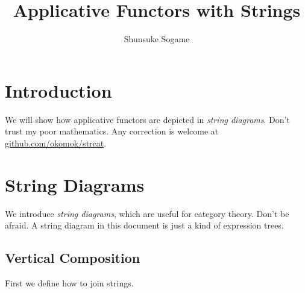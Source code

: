 \documentclass{article}
\title{Applicative Functors with Strings}
\author{Shunsuke Sogame}
\begin{document}
\maketitle


\section{Introduction}

We will show how applicative functors are depicted in \emph{string diagrams}. %
Don't trust my poor mathematics. Any correction is welcome at %
\href{https://github.com/okomok/strcat}{github.com/okomok/strcat}.  


\section{String Diagrams}

We introduce \emph{string diagrams}, which are useful for category theory. %
Don't be afraid. A string diagram in this document is just a kind of expression trees.

\subsection{Vertical Composition}

First we define how to join strings.




\end{document}
